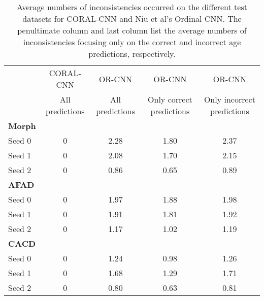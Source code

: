 \documentclass[times,twocolumn,final,authoryear]{elsarticle}
\begin{document}
\begin{table*}
\centering
\caption{Average numbers of inconsistencies occurred on the different test datasets for CORAL-CNN and Niu et al's Ordinal CNN. The penultimate column and last column list the average numbers of inconsistencies focusing only on the correct and incorrect age predictions, respectively.}
\label{tab:inconsistency}
\begin{tabular}{|l|c|c|c|c|} 
\cline{2-5}
\multicolumn{1}{l|}{} & CORAL-CNN & OR-CNN \citep{niu2016ordinal} & OR-CNN \citep{niu2016ordinal}& OR-CNN \citep{niu2016ordinal}\\ 
\multicolumn{1}{l|}{} & All predictions & All predictions & Only correct predictions & Only incorrect predictions \\ 
\hline
\textbf{Morph}                 &             &               &                       &                      \\
Seed 0                & 0           & 2.28          & 1.80                  & 2.37                 \\
Seed 1                & 0           & 2.08          & 1.70                  & 2.15                 \\
Seed 2                & 0           & 0.86          & 0.65                  & 0.89                 \\ 
\hline
\textbf{AFAD}                  &             &               &                       &                      \\
Seed 0                & 0           & 1.97          & 1.88                  & 1.98                \\
Seed 1                & 0           & 1.91          & 1.81                  & 1.92                 \\
Seed 2                & 0           & 1.17        & 1.02                 & 1.19                \\ 
\hline
\textbf{CACD}                  &             &               &                       &                      \\
Seed 0                & 0           & 1.24          & 0.98                  & 1.26                 \\
Seed 1                & 0           & 1.68         & 1.29                 & 1.71                 \\
Seed 2                & 0           & 0.80         & 0.63                  & 0.81                 \\
\hline
\end{tabular}
\end{table*}
\end{document}
